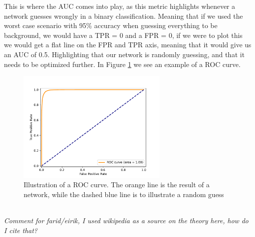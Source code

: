 \documentclass[12pt, a4paper]{book}
\begin{document}
This is where the AUC comes into play, as this metric highlights whenever a network guesses wrongly in a binary classification. Meaning that if we used the worst case scenario with 95\% accuracy when guessing everything to be background, we would have a TPR = 0 and a FPR = 0, 
if we were to plot this we would get a flat line on the FPR and TPR axis, meaning that it would give us an AUC of 0.5. Highlighting that our network is randomly guessing, and that it needs to be optimized further. In Figure \ref{fig:ROC} we see an example of a ROC curve.
\graphicspath{{../../../Plots/Plot_types/}}
\begin{figure}[!ht]
	\centering
    \includegraphics[width=0.65\textwidth]{ROC.pdf}
    \caption[ROC curve illustration]{Illustration of a ROC curve. The orange line is the result of a network, while the dashed blue line is to illustrate a random guess}\label{fig:ROC}
\end{figure}
\\\textit{Comment for farid/eirik, I used wikipedia as a source on the theory here, how do I cite that?}
\end{document}
